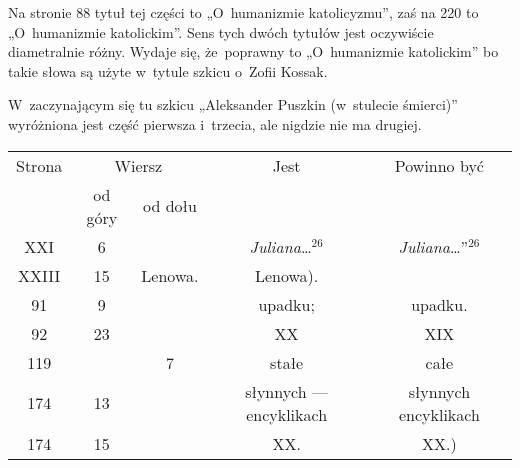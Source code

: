 \documentclass[a4paper,11pt]{article}
\numberwithin{equation}{section}
\begin{document}


 Na stronie 88 tytuł tej części to „O~humanizmie
katolicyzmu”, zaś na 220 to „O~humanizmie katolickim”. Sens tych dwóch
tytułów jest oczywiście diametralnie różny. Wydaje się, że~poprawny to
„O~humanizmie katolickim” bo takie słowa są użyte w~tytule szkicu
o~Zofii Kossak.

\VerSpaceFour





 W~zaczynającym się tu szkicu „Aleksander Puszkin
(w~stulecie śmierci)” wyróżniona jest część pierwsza i~trzecia, ale
nigdzie nie ma drugiej.

\VerSpaceFour







\begin{center}

  \begin{tabular}{|c|c|c|c|c|}
    \hline
    Strona & \multicolumn{2}{c|}{Wiersz} & Jest
                              & Powinno być \\ \cline{2-3}
    & od góry & od dołu & & \\
    \hline
    XXI   &  6 & & \textit{Juliana}\ldots$^{ 26 }$
           & \textit{Juliana}\ldots”$^{ 26 }$ \\
    XXIII & 15 & Lenowa. & Lenowa). \\
    91  &  9 & & upadku; & upadku. \\
    92  & 23 & & XX & XIX \\
    119 & & 7 & stałe & całe \\
    174 & 13 & & słynnych --- encyklikach & słynnych encyklikach \\
    174 & 15 & & XX. & XX.) \\
    \hline
  \end{tabular}

\end{center}

\VerSpaceTwo
\end{document}
